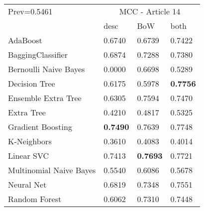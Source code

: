 \begin{tabular}{|l|l|l|l| }
\hline
Prev=0.5461 &  \multicolumn{3}{c|}{MCC - Article 14} \\
\cline{2-4} & desc & BoW & both \\ \hline
AdaBoost                & 0.6740 & 0.6739 & 0.7422\\
BaggingClassifier       & 0.6874 & 0.7288 & 0.7380\\
Bernoulli Naive Bayes   & 0.0000 & 0.6698 & 0.5289\\
Decision Tree           & 0.6175 & 0.5978 & {\bf 0.7756}\\
Ensemble Extra Tree     & 0.6305 & 0.7594 & 0.7470\\
Extra Tree              & 0.4210 & 0.4817 & 0.5325\\
Gradient Boosting       & {\bf 0.7490} & 0.7639 & 0.7748\\
K-Neighbors             & 0.3610 & 0.4083 & 0.4014\\
Linear SVC              & 0.7413 & {\bf 0.7693} & 0.7721\\
Multinomial Naive Bayes & 0.5540 & 0.6086 & 0.5678\\
Neural Net              & 0.6819 & 0.7348 & 0.7551\\
Random Forest           & 0.6062 & 0.7310 & 0.7448\\
\hline
\end{tabular}